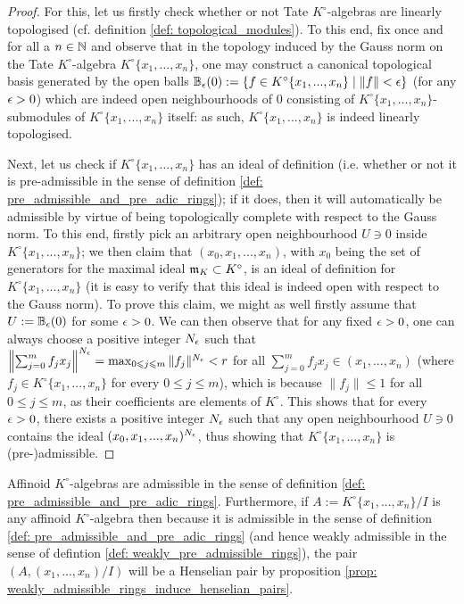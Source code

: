                 \begin{proof}
                    For this, let us firstly check whether or not Tate $K^{\circ}$-algebras are linearly topologised (cf. definition \ref{def: topological_modules}). To this end, fix once and for all a $n \in \mathbb{N}$ and observe that in the topology induced by the Gauss norm on the Tate $K^{\circ}$-algebra $K^{\circ}\{x_1, ..., x_n\}$, one may construct a canonical topological basis generated by the open balls $\mathbb{B}_{\epsilon}(0) := \{f \in K^{\circ}\{x_1, ..., x_n\} \mid \|f\| < \epsilon\}$ (for any $\epsilon > 0$) which are indeed open neighbourhoods of $0$ consisting of $K^{\circ}\{x_1, ..., x_n\}$-submodules of $K^{\circ}\{x_1, ..., x_n\}$ itself: as such, $K^{\circ}\{x_1, ..., x_n\}$ is indeed linearly topologised. 
                
                    Next, let us check if $K^{\circ}\{x_1, ..., x_n\}$ has an ideal of definition (i.e. whether or not it is pre-admissible in the sense of definition \ref{def: pre_admissible_and_pre_adic_rings}); if it does, then it will automatically be admissible by virtue of being topologically complete with respect to the Gauss norm.  To this end, firstly pick an arbitrary open neighbourhood $U \ni 0$ inside $K^{\circ}\{x_1, ..., x_n\}$; we then claim that $(x_0, x_1, ..., x_n)$, with $x_0$ being the set of generators for the maximal ideal $\mathfrak{m}_K \subset K^{\circ}$, is an ideal of definition for $K^{\circ}\{x_1, ..., x_n\}$ (it is easy to verify that this ideal is indeed open with respect to the Gauss norm). To prove this claim, we might as well firstly assume that $U := \mathbb{B}_{\epsilon}(0)$ for some $\epsilon > 0$. We can then observe that for any fixed $\epsilon > 0$, one can always choose a positive integer $N_{\epsilon}$ such that $\left\| \sum_{j = 0}^m f_j x_j \right\|^{N_{\epsilon}} = \max_{0 \leqslant j \leqslant m} \|f_j\|^{N_{\epsilon}} < r$ for all $\sum_{j = 0}^m f_j x_j \in (x_1, ..., x_n)$ (where $f_j \in K^{\circ}\{x_1, ..., x_n\}$ for every $0 \leq j \leq m$), which is because $\|f_j\| \leq 1$ for all $0 \leq j \leq m$, as their coefficients are elements of $K^{\circ}$. This shows that for every $\epsilon > 0$, there exists a positive integer $N_{\epsilon}$ such that any open neighbourhood $U \ni 0$ contains the ideal $(x_0, x_1, ..., x_n)^{N_{\epsilon}}$, thus showing that $K^{\circ}\{x_1, ..., x_n\}$ is (pre-)admissible. 
                \end{proof}
            \begin{corollary} \label{coro: affinoid_algebras_over_valuation_rings_are_topologically_pre_admissible}
                Affinoid $K^{\circ}$-algebras are admissible in the sense of definition \ref{def: pre_admissible_and_pre_adic_rings}. Furthermore, if $A := K^{\circ}\{x_1, ..., x_n\}/I$ is any affinoid $K^{\circ}$-algebra then because it is admissible in the sense of definition \ref{def: pre_admissible_and_pre_adic_rings} (and hence weakly admissible in the sense of defintion \ref{def: weakly_pre_admissible_rings}), the pair $(A, (x_1, ..., x_n)/I)$ will be a Henselian pair by proposition \ref{prop: weakly_admissible_rings_induce_henselian_pairs}.
            \end{corollary}
